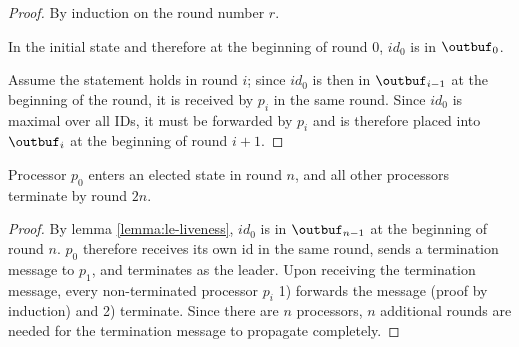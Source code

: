 \begin{proof} \label{lemma:le-liveness}
By induction on the round number $r$.

In the initial state and therefore at the beginning of round $0$, $id_0$ is in $\outbuf_0$.

Assume the statement holds
in round $i$; since $id_0$ is then in $\outbuf_{i-1}$ at the beginning of the round, it is received
by $p_i$ in the same round. Since $id_0$ is maximal over all IDs, it must be forwarded by $p_i$
and is therefore placed into $\outbuf_i$ at the beginning of round $i + 1$.
\end{proof}

\begin{theorem}
Processor $p_0$ enters an elected state in round $n$, and all other processors terminate
by round $2n$.
\end{theorem}

\begin{proof}
By lemma \ref{lemma:le-liveness}, $id_0$ is in $\outbuf_{n-1}$ at the beginning of round $n$.
$p_0$ therefore receives its own id in the same round, sends a termination message to $p_1$,
and terminates as the leader. Upon receiving the termination message, every non-terminated
processor $p_i$ 1) forwards the message (proof by induction) and 2) terminate. Since there are
$n$ processors, $n$ additional rounds are needed for the termination message to propagate completely.
\end{proof}

